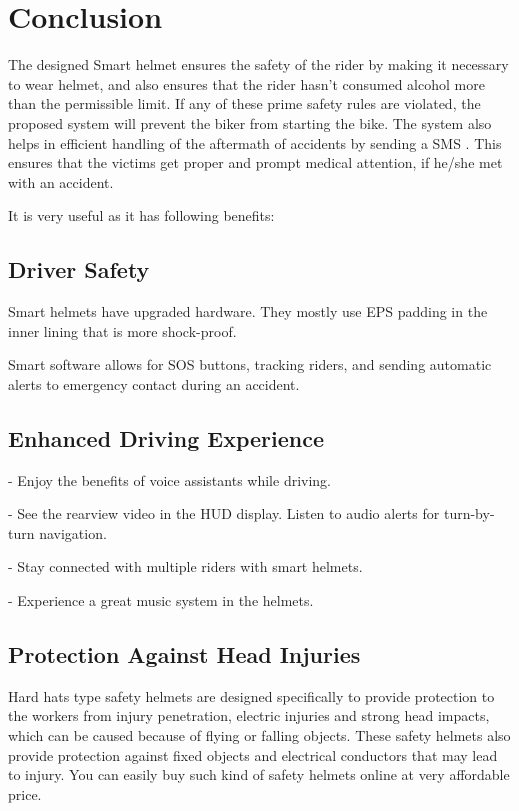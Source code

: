 \chapter{Conclusion}
The designed Smart helmet ensures the safety of the rider
by making it necessary to wear helmet, and also ensures
that the rider hasn’t consumed alcohol more than the
permissible limit. If any of these prime safety rules are
violated, the proposed system will prevent the biker from
starting the bike. The system also helps in efficient
handling of the aftermath of accidents by sending a SMS
. This
ensures that the victims get proper and prompt medical
attention, if he/she met with an accident.

\vspace{.9cm}
It is very useful as it has following benefits: \vspace{.3cm}

\section{Driver Safety}

Smart helmets have upgraded hardware. They mostly use EPS padding in the inner lining that is more shock-proof. 

Smart software allows for SOS buttons, tracking riders, and sending automatic alerts to emergency contact during an accident.
\vspace{.9cm}

\section{Enhanced Driving Experience }

- Enjoy the benefits of voice assistants while driving.

- See the rearview video in the HUD display. Listen to audio alerts for turn-by-turn navigation.

- Stay connected with multiple riders with smart helmets.

- Experience a great music system in the helmets. 
\vspace{.9cm}

\section{Protection Against Head Injuries}

Hard hats type safety helmets are designed specifically to provide protection to the workers from injury penetration, electric injuries and strong head impacts, which can be caused because of flying or falling objects. These safety helmets also provide protection against fixed objects and electrical conductors that may lead to injury. You can easily buy such kind of safety helmets online at very affordable price.
\vspace{.9cm}


